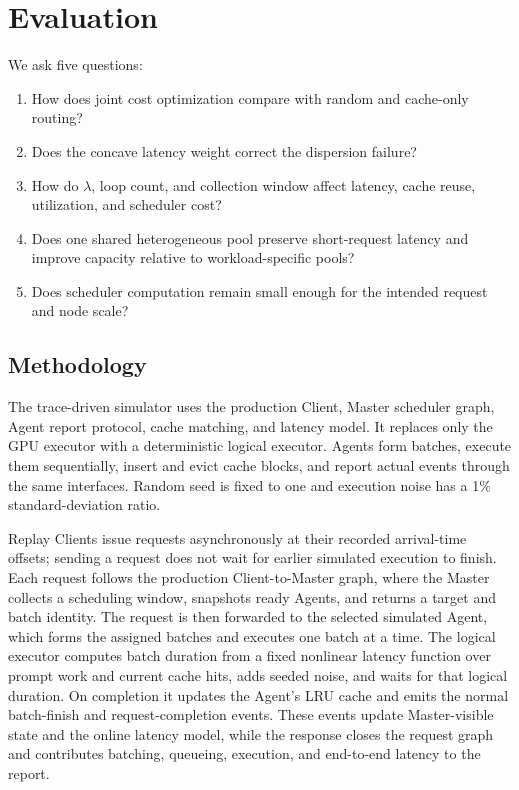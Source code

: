 \documentclass[10pt]{article}
\begin{document}
\section{Evaluation}
\label{sec:evaluation}

We ask five questions:

\begin{enumerate}
  \item How does joint cost optimization compare with random and cache-only
        routing?
  \item Does the concave latency weight correct the dispersion failure?
  \item How do $\lambda$, loop count, and collection window affect latency,
        cache reuse, utilization, and scheduler cost?
  \item Does one shared heterogeneous pool preserve short-request latency and
        improve capacity relative to workload-specific pools?
  \item Does scheduler computation remain small enough for the intended
        request and node scale?
\end{enumerate}

\subsection{Methodology}

The trace-driven simulator uses the production Client, Master scheduler graph,
Agent report protocol, cache matching, and latency model. It replaces only the
GPU executor with a deterministic logical executor. Agents form batches,
execute them sequentially, insert and evict cache blocks, and report actual
events through the same interfaces. Random seed is fixed to one and execution
noise has a 1\% standard-deviation ratio.

Replay Clients issue requests asynchronously at their recorded arrival-time
offsets; sending a request does not wait for earlier simulated execution to
finish. Each request follows the production Client-to-Master graph, where the
Master collects a scheduling window, snapshots ready Agents, and returns a
target and batch identity. The request is then forwarded to the selected
simulated Agent, which forms the assigned batches and executes one batch at a
time. The logical executor computes batch duration from a fixed nonlinear
latency function over prompt work and current cache hits, adds seeded noise,
and waits for that logical duration. On completion it updates the Agent's LRU
cache and emits the normal batch-finish and request-completion events. These
events update Master-visible state and the online latency model, while the
response closes the request graph and contributes batching, queueing,
execution, and end-to-end latency to the report.
\end{document}
